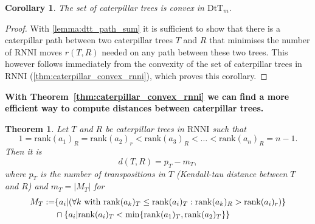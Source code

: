 \documentclass[11pt]{amsart}
\newtheorem{theorem}{Theorem}
\newtheorem{corollary}{Corollary}
\newcommand{\rnni}{\mathrm{RNNI}}
\newcommand{\rank}{\mathrm{rank}}
\newcommand{\dtt}{\mathrm{DtT}}
\newcommand{\summary}[1]{\textbf{#1}} %
\begin{document}
\begin{corollary}
	The set of caterpillar trees is convex in $\dtt_m$.
\end{corollary}

\begin{proof}
	With \autoref{lemma:dtt_path_sum} it is sufficient to show that there is a caterpillar path between two caterpillar trees $T$ and $R$ that minimises the number of $\rnni$ moves $r(T,R)$ needed on any path between these two trees.
	This however follows immediately from the convexity of the set of caterpillar trees in $\rnni$ (\autoref{thm:caterpillar_convex_rnni}), which proves this corollary.
\end{proof}

\summary{With Theorem~\ref{thm:caterpillar_convex_rnni} we can find a more efficient way to compute distances between caterpillar trees.}

\begin{theorem}
	Let $T$ and $R$ be caterpillar trees in $\rnni$ such that \[1 = \rank(a_1)_R = \rank(a_2)_r < \rank(a_3)_R < \ldots < \rank(a_n)_R = n-1.\]
	Then it is
	\[d(T,R) = p_T - m_T,\]
	where $p_T$ is the number of transpositions in $T$ (Kendall-tau distance between $T$ and $R$) and $m_T = |M_T|$ for
	\begin{align*}
		M_T := &\{a_i| (\forall k \textnormal{ with } \rank(a_k)_T \leq \rank(a_i)_T: \rank(a_k)_R > \rank(a_i)_r)\} \\
		& \cap \{a_i | \rank(a_i)_T < \min\{\rank(a_1)_T, \rank(a_2)_T\}\}
	\end{align*}
	\label{thm:caterpillar_distance_formula}
\end{theorem}
\end{document}
